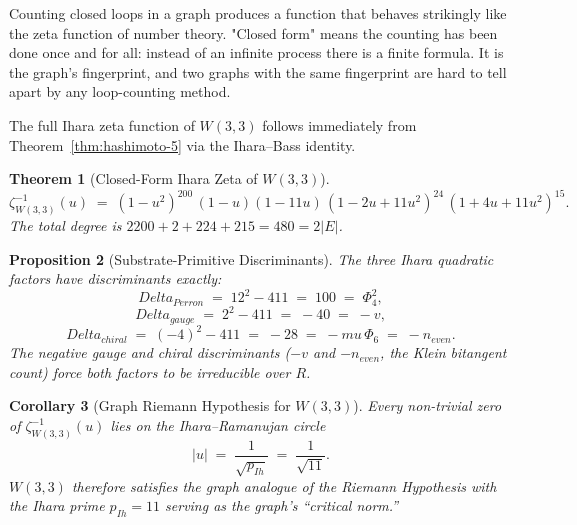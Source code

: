 \documentclass[12pt,a4paper]{article}
\def\mathbb#1{#1}%
\def\mathrm#1{#1}%
\def\textbf#1{#1}%
\def\Delta{Delta}%
\def\mu{mu}%
\def\Phi#1{Phi#1}%
\def\cdot{ }%
\newtheorem{theorem}{Theorem}[section]
\newtheorem{proposition}[theorem]{Proposition}
\newtheorem{corollary}[theorem]{Corollary}
\theoremstyle{definition}
\begin{document}
\begin{plainbox}
Counting closed loops in a graph produces a function that behaves strikingly like
the zeta function of number theory. "Closed form" means the counting has been done once and
for all: instead of an infinite process there is a finite formula. It is the graph's
fingerprint, and two graphs with the same fingerprint are hard to tell apart by any
loop-counting method.
\end{plainbox}

\label{sec:ihara-zeta}

The full Ihara zeta function of $W(3,3)$ follows immediately from
Theorem~\ref{thm:hashimoto-5} via the Ihara--Bass identity.

\begin{theorem}[Closed-Form Ihara Zeta of $W(3,3)$]
\label{thm:ihara-closed}
\begin{equation}
\boxed{
\zeta_{W(3,3)}^{-1}(u)
\;=\; (1 - u^2)^{200}\,(1 - u)(1 - 11 u)\,
      (1 - 2 u + 11 u^2)^{24}\,(1 + 4 u + 11 u^2)^{15}.
}
\end{equation}
The total degree is $2 \cdot 200 + 2 + 2 \cdot 24 + 2 \cdot 15 = 480 = 2 |E|$.
\end{theorem}

\begin{proposition}[Substrate-Primitive Discriminants]
\label{prop:zeta-disc}
The three Ihara quadratic factors have discriminants exactly:
\[
\Delta_{\mathrm{Perron}} \;=\; 12^2 - 4\!\cdot\!11 \;=\; 100 \;=\; \Phi_4^2,
\]
\[
\Delta_{\mathrm{gauge}} \;=\; 2^2 - 4\!\cdot\!11 \;=\; -40 \;=\; -v,
\]
\[
\Delta_{\mathrm{chiral}} \;=\; (-4)^2 - 4\!\cdot\!11 \;=\; -28 \;=\; -\mu\,\Phi_6
                                                              \;=\; -n_{\mathrm{even}}.
\]
The negative gauge and chiral discriminants ($-v$ and $-n_{\mathrm{even}}$,
the Klein bitangent count) force both factors to be irreducible over
$\mathbb{R}$.
\end{proposition}

\begin{corollary}[Graph Riemann Hypothesis for $W(3,3)$]
\label{cor:graph-rh}
Every non-trivial zero of $\zeta_{W(3,3)}^{-1}(u)$ lies on the
\textbf{Ihara--Ramanujan circle}
\[
|u| \;=\; \frac{1}{\sqrt{p_{\mathrm{Ih}}}}
\;=\; \frac{1}{\sqrt{11}}.
\]
$W(3,3)$ therefore satisfies the graph analogue of the Riemann
Hypothesis with the Ihara prime $p_{\mathrm{Ih}} = 11$ serving as the
graph's ``critical norm.''
\end{corollary}
\end{document}
